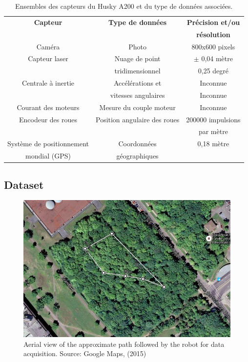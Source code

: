 \begin{table}[h]
    \begin{center}
        \caption{\label{tab:capteurs} Ensembles des capteurs du Husky A200 et du type de données associées.}
        \begin{tabular}{|c|c|c|}
            \hline
            \textbf{Capteur} & \textbf{Type de données} & \textbf{Précision et/ou}\\
                             &                          & \textbf{résolution} \\
            \hline
            \hline
            Caméra & Photo & 800x600 pixels\\
            \hline
            Capteur laser & Nuage de point & $\pm$ 0,04 mètre\\
                          & tridimensionnel & 0,25 degré\\
            \hline
            Centrale à inertie & Accélérations et & Inconnue\\
                                & vitesses angulaires & Inconnue\\
            \hline
            Courant des moteurs & Mesure du couple moteur & Inconnue\\
            \hline
            Encodeur des roues & Position angulaire des roues & 200000 impulsions\\
                               &                              &  par mètre\\
            \hline
            Système de positionnement & Coordonnées & 0,18 mètre\\
            mondial (GPS)             & géographiques & \\
            \hline
        \end{tabular}
    \end{center}
\end{table}

\subsection{Dataset}
\begin{figure}[htpb]
    \centering
    \includegraphics[width=0.95\linewidth]{img/chap_slam/path.png}
    \caption{Aerial view of the approximate path followed by the robot for data acquisition. Source: Google Maps, (2015)}
    \label{fig:chap_slam_path}
\end{figure}
